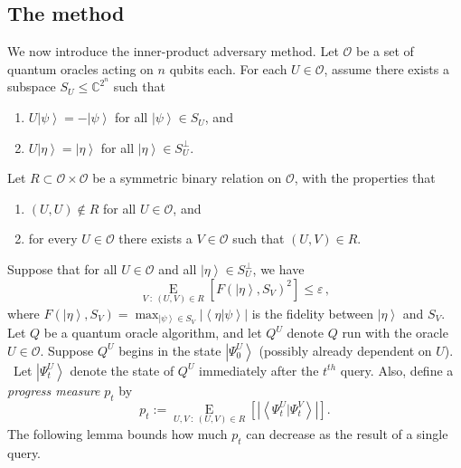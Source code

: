 \subsection{The method\label{THEMETHOD}}

We now introduce the inner-product adversary method. Let $\mathcal{O}$ be a
set of quantum oracles acting on $n$ qubits each. For each $U\in\mathcal{O}%
$, assume there exists a subspace $S_{U}\leq\mathbb{C}^{2^{n}}$ such that

\begin{enumerate}
\item[(i)] $U\left\vert \psi\right\rangle =-\left\vert \psi\right\rangle
$ for all $\left\vert \psi\right\rangle \in S_{U}$, and

\item[(ii)] $U\left\vert \eta\right\rangle =\left\vert \eta\right\rangle
$ for all $\left\vert \eta\right\rangle \in S_{U}^{\bot}$.
\end{enumerate}

Let $R\subset\mathcal{O}\times\mathcal{O}$ be a symmetric binary relation on
$\mathcal{O}$, with the properties that

\begin{enumerate}
\item[(i)] $\left(  U,U\right)  \notin R$ for all $U\in\mathcal{O}$, and

\item[(ii)] for every $U\in\mathcal{O}$ there exists a $V\in\mathcal{O}%
$ such that $\left(  U,V\right)  \in R$.\
\end{enumerate}

Suppose that for all $U\in\mathcal{O}$ and all $\left\vert \eta\right\rangle
\in S_{U}^{\bot}$, we have%
\[
\operatorname*{E}_{V~:~\left(  U,V\right)  \in R}\left[  F\left(  \left\vert
\eta\right\rangle ,S_{V}\right)  ^{2}\right]  \leq\varepsilon\,,
\]
where $F\left(  \left\vert \eta\right\rangle ,S_{V}\right)  =\max_{\left\vert
\psi\right\rangle \in S_{V}}\left\vert \left\langle \eta|\psi\right\rangle
\right\vert $ is the fidelity between $\left\vert \eta\right\rangle $ and
$S_{V}$. Let $Q$ be a quantum oracle algorithm, and let $Q^{U}$ denote $Q$
run with the oracle $U\in\mathcal{O}$. Suppose $Q^{U}$ begins in the state
$\left\vert \Psi_{0}^{U}\right\rangle $ (possibly already dependent on $U$).
\ Let $\left\vert \Psi_{t}^{U}\right\rangle $ denote the state of $Q^{U}%
$ immediately after the $t^{th}$ query. Also, define a \emph{progress
measure} $p_{t}$ by%
\[
p_{t}:=\operatorname*{E}_{U,V~:~\left(  U,V\right)  \in R}\left[  \left\vert
\left\langle \Psi_{t}^{U}|\Psi_{t}^{V}\right\rangle \right\vert \right]  .
\]
The following lemma bounds how much $p_{t}$ can decrease as the result of a
single query.

